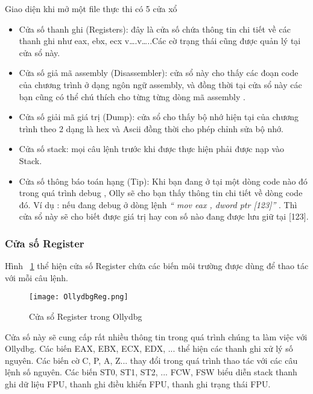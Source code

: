 Giao diện khi mở một file thực thi có 5 cửa xổ
	
	\begin{itemize}
		\item[1] Cửa số thanh ghi (Registers): đây là cửa số chứa thông tin chi tiết về các thanh ghi như eax, ebx, ecx v….v…..Các cờ trạng thái cũng được quản lý tại cửa sổ này.
		\item[2] Cửa số giả mã assembly (Disassembler): cửa sổ này cho thấy các đoạn code của chương trình ở dạng ngôn ngữ assembly, và đồng thời tại cửa sổ này các bạn cũng có thể chú thích cho từng từng dòng mã assembly .
		\item[3] Cửa số giải mã giá trị (Dump): cửa sổ cho thấy bộ nhớ hiện tại của chương trình theo 2 dạng là hex và Ascii đồng thời cho phép chỉnh sửa bộ nhớ.
		\item[4] Cửa số stack:  mọi câu lệnh trước khi được thực hiện phải được nạp vào Stack.
		\item[5] Cửa số thông báo toán hạng (Tip):  Khi bạn đang ở tại một dòng code nào đó trong quá trình debug ,  Olly sẽ cho bạn thấy thông tin chi tiết về dòng code đó. Ví dụ  : nếu đang debug ở dòng lệnh \textit{ “ mov eax , dword ptr [123]”} . Thì cửa sổ này sẽ cho biết được giá trị hay con số nào đang được lưu giữ tại [123].
		\end{itemize}
	
	\subsubsection*{Cửa số Register}	
	Hình ~\ref{fig:OllydbgReg} thể hiện cửa số Register chứa các biến môi trường được dùng để thao tác với  mỗi câu lệnh.
	\begin{center}
			\begin{figure}[htp]
				\begin{center}
					\texttt{[image: OllydbgReg.png]}
				\end{center}
				\caption{Cửa sổ Register trong Ollydbg}	
					\label{fig:OllydbgReg}		
			\end{figure}
		\end{center}		
		
		Cửa số này sẽ cung cấp rất nhiều thông tin trong quá trình chúng ta làm việc với Ollydbg. Các biến EAX, EBX, ECX, EDX, ... thể hiện các thanh ghi xử lý số nguyên. Các biến cờ C, P, A, Z... thay đổi trong quá trình thao tác với các câu lệnh số nguyên. Các biến ST0, ST1, ST2, ... FCW, FSW biểu diễn stack thanh ghi dữ liệu FPU, thanh ghi điều khiển FPU, thanh ghi trạng thái FPU.
		

